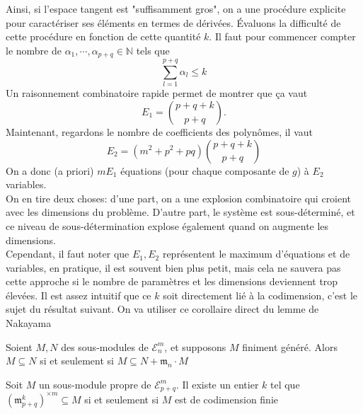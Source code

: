 \documentclass[memoire.tex]{subfiles}
\begin{document}
Ainsi, si l'espace tangent est "suffisamment gros", on a une procédure explicite pour caractériser ses éléments en termes de dérivées. Évaluons la difficulté de cette procédure en fonction de cette quantité $k$. Il faut pour commencer compter le nombre de $\alpha_1,\cdots,\alpha_{p+q}\in\mathbb{N}$ tels que
\begin{equation*}
    \sum_{l=1}^{p+q}\alpha_l\leq k
\end{equation*}
Un raisonnement combinatoire rapide permet de montrer que ça vaut
\begin{equation}\label{Nbeq}
    E_1=\binom{p+q+k}{p+q}.
\end{equation}
Maintenant, regardons le nombre de coefficients des polynômes, il vaut
\begin{equation}\label{nbVer}
    E_2=(m^2+p^2+pq)\binom{p+q+k}{p+q}
\end{equation}
On a donc (a priori) $mE_1$ équations (pour 
chaque composante de $g$) à $E_2$ variables.\\
On en tire deux choses: d'une part, on a une 
explosion combinatoire qui croient avec les dimensions du 
problème. D'autre part, le système est sous-déterminé, et ce niveau de sous-détermination 
explose également quand on augmente les 
dimensions.\\
Cependant, il faut noter que $E_1,E_2$ représentent le maximum d'équations et de variables, en pratique, il est souvent bien plus petit, mais cela ne sauvera pas cette approche si le nombre de paramètres et les dimensions deviennent trop élevées.
Il est assez intuitif que ce $k$ soit directement lié à la codimension, c'est le sujet du résultat suivant. On va utiliser  ce corollaire direct du lemme de Nakayama
\begin{corollaire}
    Soient $M,N$ des sous-modules de $\mathcal{E}^m_n$, et supposons $M$ finiment généré. Alors $M\subseteq N$ si et seulement si $M\subseteq N+
    \mathfrak{m}_n\cdot M$
\end{corollaire} 
\begin{proposition}
    Soit $M$ un sous-module propre de 
    $\mathcal{E}^m_{p+q}$. Il existe un entier $k$ tel que $(\mathfrak{m}^k_{p+q})^{\times m}\subseteq M$ si et seulement si $M$ est de codimension finie
\end{proposition}
\end{document}

